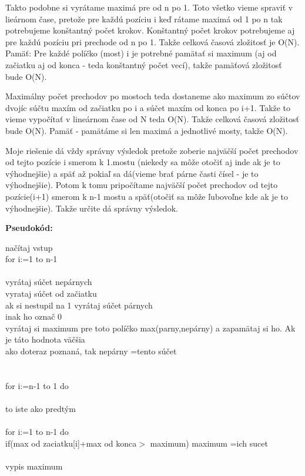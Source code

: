 \documentclass[a4paper,11pt]{article}
\begin{document}
Takto podobne si vyrátame maximá pre od n po 1.
Toto všetko vieme spraviť v lieárnom čase, pretože pre každú pozíciu i keď rátame maximá od 1 po n tak potrebujeme konštantný počet krokov. Konštantný počet krokov potrebujeme aj pre každú pozíciu pri prechode od n po 1. Takže celková časová zložitosť je O(N). Pamäť: Pre každé políčko (most) i je potrebné pamätať si maximum (aj od začiatku aj od konca - teda konštantný počet vecí), takže pamäťová zložitosť bude O(N).

Maximálny počet prechodov po mostoch teda dostaneme ako maximum zo súčtov dvojíc súčtu maxím od začiatku po i a súčet maxím od konca po i+1. Takže to vieme vypočítať v lineárnom čase od N teda O(N). Takže celková časová zložitosť bude O(N). Pamäť - pamätáme si len maximá a jednotlivé mosty, takže O(N).

Moje riešenie dá vždy správny výsledok pretože zoberie najväčší počet prechodov od tejto pozície i smerom k 1.mostu (niekedy sa môže otočiť aj inde ak je to výhodnejšie) a späť až pokiaľ sa dá(vieme brať párne časti čísel - je to výhodnejšie). Potom k tomu pripočítame najväčší počet prechodov od tejto pozície(i+1) smerom k n-1 mostu a späť(otočiť sa môže ľubovoľne kde ak je to výhodnejšie). Takže určite dá správny výsledok.

\textbf {Pseudokód:}

načítaj vstup\\
for i:=1 to n-1\\
{\\
vyrátaj súčet nepárnych\\
vyrataj súčet od začiatku\\
ak si nestupil na 1 vyrátaj súčet párnych\\
inak ho označ 0\\

vyrátaj si maximum pre toto políčko max(parny,nepárny) a zapamätaj si ho. Ak je táto hodnota väčšia\\
 ako doteraz poznaná, tak nepárny =tento súčet\\
}\\
\\

for i:=n-1 to 1 do\\
{\\
to iste ako predtým\\
}\\
for i:=1 to n-1 do \\

if(max od zaciatku[i]+max od konca$>$ maximum) maximum =ich sucet\\
\\

vypis maximum\\
\end{document}

